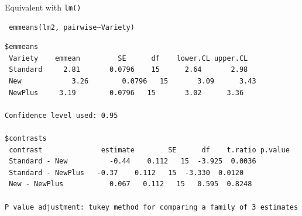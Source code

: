 \documentclass[10pt]{beamer}
\makeatletter
\newenvironment{kframe}{%
 \def\at@end@of@kframe{}%
 \ifinner\ifhmode%
  \def\at@end@of@kframe{\end{minipage}}%
  \begin{minipage}{\columnwidth}%
 \fi\fi%
 \def\FrameCommand##1{\hskip\@totalleftmargin \hskip-\fboxsep
 \colorbox{shadecolor}{##1}\hskip-\fboxsep
     \hskip-\linewidth \hskip-\@totalleftmargin \hskip\columnwidth}%
 \MakeFramed {\advance\hsize-\width
   \@totalleftmargin\z@ \linewidth\hsize
   \@setminipage}}%
 {\par\unskip\endMakeFramed%
 \at@end@of@kframe}
\newenvironment{knitrout}{}{} %
\makeatother
\begin{document}
\begin{frame}[fragile]{Equivalent with \texttt{lm()}}
    \begin{knitrout}
\color{fgcolor}\begin{kframe}
\footnotesize
\begin{verbatim}
 emmeans(lm2, pairwise~Variety)
\end{verbatim}
\end{kframe}
\end{knitrout}
 
   \begin{knitrout}
\color{fgcolor}\begin{kframe}
\footnotesize
\begin{verbatim}
$emmeans
 Variety    emmean         SE      df    lower.CL upper.CL
 Standard     2.81       0.0796    15      2.64       2.98
 New            3.26        0.0796   15       3.09      3.43
 NewPlus     3.19        0.0796   15       3.02      3.36
 
Confidence level used: 0.95 
 
$contrasts
 contrast              estimate        SE      df    t.ratio p.value
 Standard - New          -0.44    0.112   15  -3.925  0.0036
 Standard - NewPlus   -0.37    0.112   15  -3.330  0.0120
 New - NewPlus           0.067   0.112   15   0.595  0.8248
 
P value adjustment: tukey method for comparing a family of 3 estimates 
             
\end{verbatim}
\end{kframe}
\end{knitrout}

\end{frame}
\end{document}
